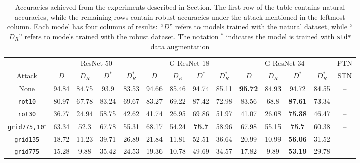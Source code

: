 \begin{table}[htb]
    \caption{Accuracies achieved from the experiments described in Section. The first row of the table contains natural accuracies, while the remaining rows contain robust accuracies under the attack mentioned in the leftmost column. Each model has four columns of results: ``$D$'' refers to models trained with the natural dataset, while ``$D_R$'' refers to models trained with the robust dataset. The notation $^*$ indicates the model is trained with \texttt{std*} data augmentation} \label{tab:spatialattack_all}
    \begin{adjustwidth}{-.5in}{-.5in}  
        \vspace{15pt}
        \begin{center}
            \begin{tabular}{|c|cccc|cccc|cccc|c|}
                \hline
                & \multicolumn{4}{c|}{ResNet-50} & \multicolumn{4}{c|}{G-ResNet-18} & \multicolumn{4}{c|}{G-ResNet-34} & PTN \\
                Attack & $D$ & $D_R$ & $D^*$ & $D_R^*$ & $D$ & $D_R$ & $D^*$ & $D_R^*$ & $D$ & $D_R$ & $D^*$ & $D_R^*$ & STN\footnotemark \\ 
                \hline
                None &
                94.84 & 84.75 & 93.9 & 83.53 &  %
                94.66 & 85.46 & 94.74 & 85.11 &  %
                \textbf{95.72} & 84.93 & 94.72 & 84.55 &  %
                -- \\
                \texttt{rot10} &
                80.97 & 67.78 & 83.24 & 69.67 &  %
                83.27 & 69.22 & 87.42 & 72.98 &  %
                83.56 & 68.8 & \textbf{87.61} & 73.34 &  %
                -- \\
                \texttt{rot30} &
                36.77 & 24.94 & 58.75 & 42.62 &  %
                41.74 & 26.95 & 69.86 & 51.97 &  %
                41.07 & 26.08 & \textbf{75.38} & 46.47 &  %
                -- \\
                \texttt{grid775,10$^\circ$} &
                63.34 & 52.3 & 67.78 & 55.31 &  %
                68.17 & 54.24 & \textbf{75.7} &  %
                58.96 & 67.98 & 55.15 & \textbf{75.7} & 60.38 &  %
                -- \\
                \texttt{grid135} &
                18.72 & 11.23 & 39.71 & 26.89 &  %
                21.84 & 11.81 & 52.51 & 36.64 &  %
                20.99 & 10.99 & \textbf{56.06} & 31.52 &  %
                -- \\
                \texttt{grid775} &
                15.28 & 9.88 & 35.42 & 24.53 &  %
                19.36 & 10.78 & 49.69 & 34.57  %
                & 17.82 & 9.89 & \textbf{53.19} & 29.78 &  %
                -- \\
                \hline
            \end{tabular}
        \end{center}
    \end{adjustwidth}
    \vspace{-15pt}
\end{table}